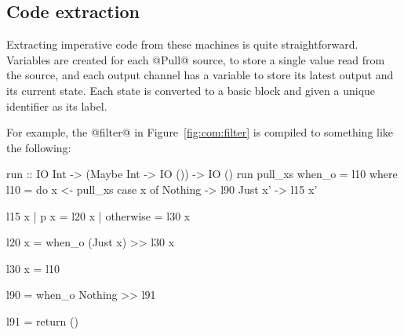 

\subsection{Code extraction}

Extracting imperative code from these machines is quite straightforward.
Variables are created for each @Pull@ source, to store a single value read from the source, and each output channel has a variable to store its latest output and its current state.
Each state is converted to a basic block and given a unique identifier as its label.

For example, the @filter@ in Figure~\ref{fig:com:filter} is compiled to something like the following:
\begin{code}
run :: IO Int -> (Maybe Int -> IO ()) -> IO ()
run pull_xs when_o = l10
 where
  l10 = do  x  <- pull_xs
            case x of
             Nothing -> l90
             Just x' -> l15 x'

  l15 x | p x       = l20 x
        | otherwise = l30 x

  l20 x =   when_o (Just x)  >> l30 x

  l30 x =   l10

  l90   =   when_o Nothing  >> l91

  l91   =   return ()
\end{code}

